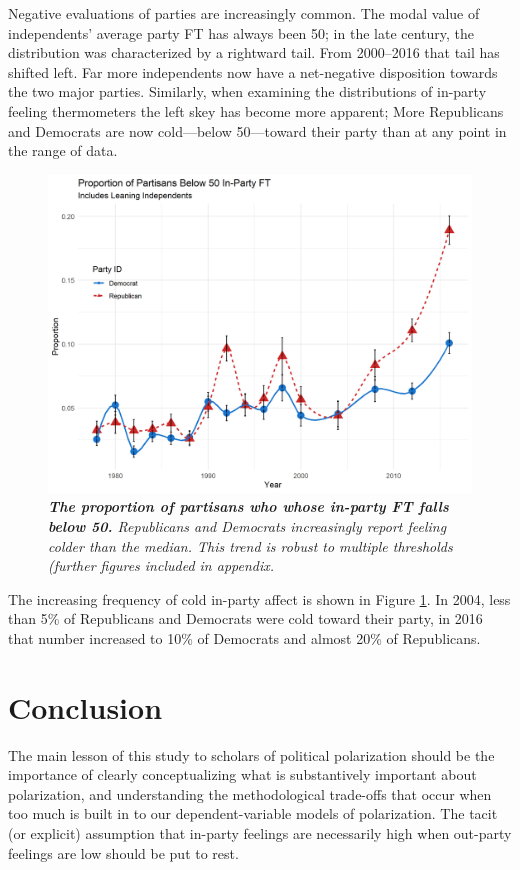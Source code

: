 \documentclass[12pt]{paper}
\begin{document}
Negative evaluations of parties are increasingly common. The modal value of independents' average party FT has always been 50; in the late  century, the distribution was characterized by a rightward tail. From 2000--2016 that tail has shifted left. Far more independents now have a net-negative disposition towards the two major parties. Similarly, when examining the distributions of in-party feeling thermometers the left skey has become more apparent; More Republicans and Democrats are now cold---below 50---toward their party than at any point in the range of data.
\begin{figure}[H]
\center\includegraphics[width=5in]{cdf-below-50-ns.png}
\caption{\label{fig:cdf-below-50} \textit{\textbf{The proportion of partisans who whose in-party FT falls below 50.} Republicans and Democrats increasingly report feeling colder than the median. This trend is robust to multiple thresholds (further figures included in appendix.}}
\end{figure}

The increasing frequency of cold in-party affect is shown in Figure \ref{fig:cdf-below-50}. In 2004, less than 5\% of Republicans and Democrats were cold toward their party, in 2016 that number increased to 10\% of Democrats and almost 20\% of Republicans.





\section{Conclusion}
The main lesson of this study to scholars of political polarization should be the importance of clearly conceptualizing what is substantively important about polarization, and understanding the methodological trade-offs that occur when too much is built in to our dependent-variable models of polarization. The tacit (or explicit) assumption that in-party feelings are necessarily high when out-party feelings are low should be put to rest.
\end{document}
